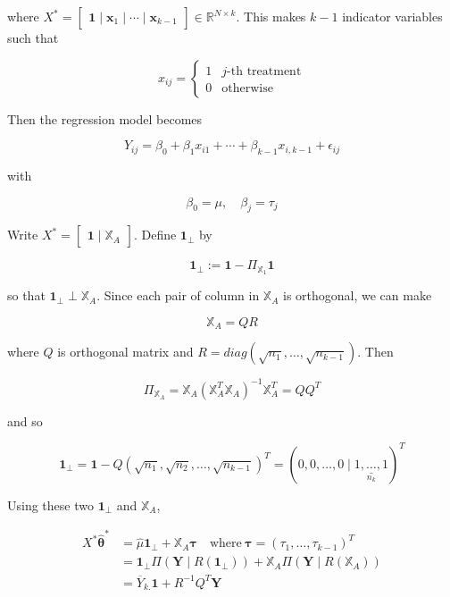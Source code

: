 \documentclass[]{book}
\theoremstyle{definition}
\theoremstyle{definition}
\theoremstyle{definition}
\theoremstyle{remark}
\begin{document}
where \(X^{\ast} = \begin{bmatrix} \mathbf{1} \mid \mathbf{x}_1 \mid \cdots \mid \mathbf{x}_{k - 1} \end{bmatrix} \in \mathbb{R}^{N \times k}\). This makes \(k - 1\) indicator variables such that

\[
x_{ij} = \begin{cases}
  1 & j\text{-th treatment} \\
  0 & \text{otherwise}
\end{cases}
\]

Then the regression model becomes

\[Y_{ij} = \beta_0 + \beta_1 x_{i1} + \cdots + \beta_{k - 1} x_{i, k - 1} + \epsilon_{ij}\]

with

\[\beta_0 = \mu, \quad \beta_j = \tau_j\]

Write \(X^{\ast} = \begin{bmatrix} \mathbf{1} \mid \mathbb{X}_A \end{bmatrix}\). Define \(\mathbf{1}_{\perp}\) by

\[\mathbf{1}_{\perp} := \mathbf{1} - \Pi_{\mathbb{X}_1}\mathbf{1}\]

so that \(\mathbf{1}_{\perp} \perp \mathbb{X}_A\). Since each pair of column in \(\mathbb{X}_A\) is orthogonal, we can make

\[\mathbb{X}_A = QR\]

where \(Q\) is orthogonal matrix and \(R = diag(\sqrt{n_1}, \ldots, \sqrt{n_{k - 1}})\). Then

\[\Pi_{\mathbb{X}_A} = \mathbb{X}_A (\mathbb{X}_A^T \mathbb{X}_A)^{-1} \mathbb{X}_A^T = QQ^T\]

and so

\[\mathbf{1}_{\perp} = \mathbf{1} - Q (\sqrt{n_1}, \sqrt{n_2}, \ldots, \sqrt{n_{k - 1}})^T = (0, 0, \ldots, 0 \mid \underset{n_k}{\underline{1, \ldots, 1}})^T\]

Using these two \(\mathbf{1}_{\perp}\) and \(\mathbb{X}_A\),

\begin{equation*}
  \begin{split}
    X^{\ast} \hat{\boldsymbol\theta}^{\ast} & = \hat\mu \mathbf{1}_{\perp} + \mathbb{X}_A \boldsymbol{\tau} \quad \text{where}\: \boldsymbol{\tau} = (\tau_1, \ldots, \tau_{k - 1})^T \\
    & = \mathbf{1}_{\perp} \Pi(\mathbf{Y} \mid R(\mathbf{1_{\perp}})) + \mathbb{X}_A \Pi(\mathbf{Y} \mid R(\mathbb{X}_A)) \\
    & = \overline{Y}_{k.}\mathbf{1} + R^{-1}Q^T \mathbf{Y}
  \end{split}
\end{equation*}
\end{document}
